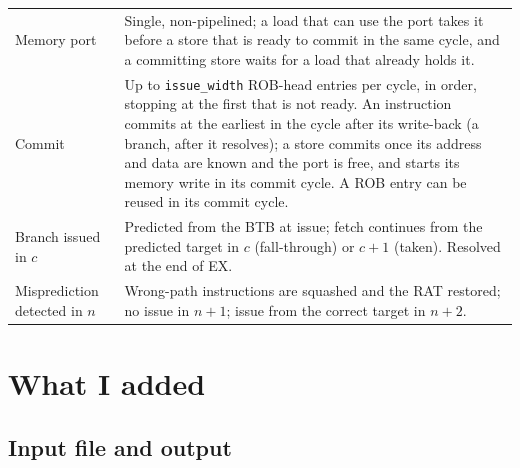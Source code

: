 \documentclass[11pt]{article}
\newcommand{\code}[1]{\texttt{#1}}
\begin{document}
\begin{table}[htbp]
\begin{tabular}{@{}p{}p{}@{}}
Memory port & Single, non-pipelined; a load that can use the port takes it before a store that is ready to commit in the same cycle, and a committing store waits for a load that already holds it. \\
Commit & Up to \code{issue\_width} ROB-head entries per cycle, in order, stopping at the first that is not ready. An instruction commits at the earliest in the cycle after its write-back (a branch, after it resolves); a store commits once its address and data are known and the port is free, and starts its memory write in its commit cycle. A ROB entry can be reused in its commit cycle. \\
Branch issued in $c$ & Predicted from the BTB at issue; fetch continues from the predicted target in $c$ (fall-through) or $c+1$ (taken). Resolved at the end of EX. \\
Misprediction detected in $n$ & Wrong-path instructions are squashed and the RAT restored; no issue in $n+1$; issue from the correct target in $n+2$. \\
\bottomrule
\end{tabular}
\end{table}

\section{What I added}
\label{sec:changes}

\subsection{Input file and output}
\end{document}
